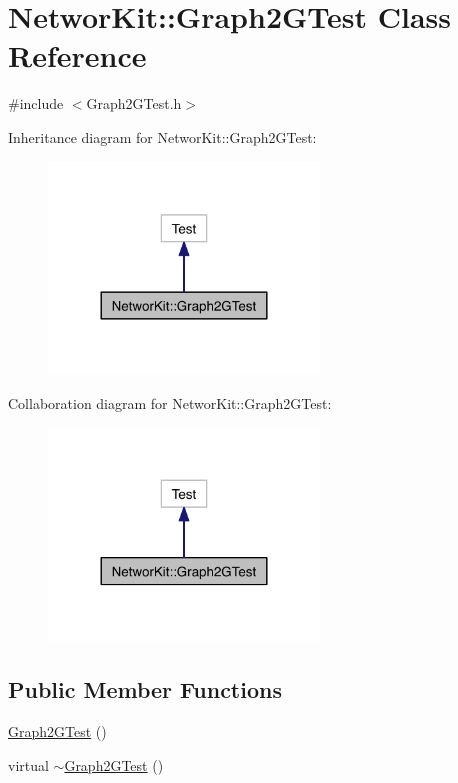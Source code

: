 \hypertarget{class_networ_kit_1_1_graph2_g_test}{\section{Networ\-Kit\-:\-:Graph2\-G\-Test Class Reference}
\label{class_networ_kit_1_1_graph2_g_test}
}


{\ttfamily \#include $<$Graph2\-G\-Test.\-h$>$}



Inheritance diagram for Networ\-Kit\-:\-:Graph2\-G\-Test\-:\nopagebreak
\begin{figure}[H]
\begin{center}
\leavevmode
\includegraphics[width=204pt]{class_networ_kit_1_1_graph2_g_test__inherit__graph}
\end{center}
\end{figure}


Collaboration diagram for Networ\-Kit\-:\-:Graph2\-G\-Test\-:\nopagebreak
\begin{figure}[H]
\begin{center}
\leavevmode
\includegraphics[width=204pt]{class_networ_kit_1_1_graph2_g_test__coll__graph}
\end{center}
\end{figure}
\subsection*{Public Member Functions}
\begin{DoxyCompactItemize}
\item 
\hyperlink{class_networ_kit_1_1_graph2_g_test_a4f696e1a124611bf84a4fd182294b40a}{Graph2\-G\-Test} ()
\item 
virtual \hyperlink{class_networ_kit_1_1_graph2_g_test_a6f0d168efe895463ef35839f86c5b241}{$\sim$\-Graph2\-G\-Test} ()
\end{DoxyCompactItemize}


